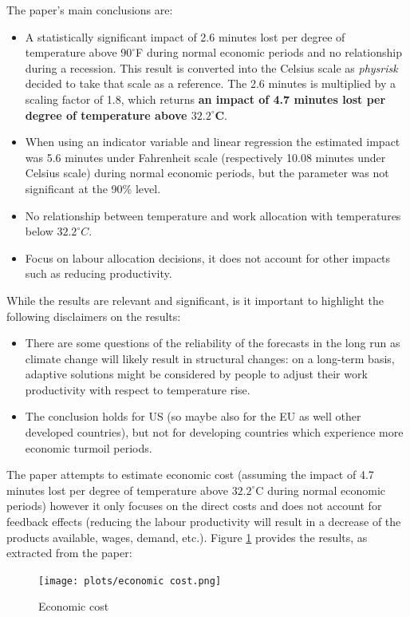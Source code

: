 \documentclass[a4paper,11pt]{extarticle} %
\begin{document}
The paper's main conclusions are:
\begin{itemize}
    \item A statistically significant impact of 2.6 minutes lost per degree of temperature above $90^\circ$F during normal economic periods and no relationship during a recession. This result is converted into the Celsius scale as \emph{physrisk} decided to take that scale as a reference. The 2.6 minutes is multiplied by a scaling factor of 1.8, which returns \textbf{an impact of 4.7 minutes lost per degree of temperature above $\mathbf{32.2^\circ}$C}.
    \item When using an indicator variable and linear regression the estimated impact was 5.6 minutes under Fahrenheit scale (respectively 10.08 minutes under Celsius scale) during normal economic periods, but the parameter was not significant at the 90\% level.
    \item No relationship between temperature and work allocation with temperatures below  $32.2^\circ C$.
    \item Focus on labour allocation decisions, it does not account for other impacts such as reducing productivity.
\end{itemize}

While the results are relevant and significant, is it important to highlight the following disclaimers on the results:
\begin{itemize}
    \item There are some questions of the reliability of the forecasts in the long run as climate change will likely result in structural changes: on a long-term basis, adaptive solutions might be considered by people to adjust their work productivity with respect to temperature rise.
    \item The conclusion holds for US (so maybe also for the EU as well other developed countries), but not for developing countries which experience more economic turmoil periods.
\end{itemize}

The paper attempts to estimate economic cost (assuming the impact of 4.7 minutes lost per degree of temperature above $32.2^\circ $C during normal economic periods) however it only focuses on the direct costs and does not account for feedback effects (reducing the labour productivity will result in a decrease of the products available, wages, demand, etc.). Figure \ref{fig:economiccost} provides the results, as extracted from the paper:
\begin{figure}[h]
    \centering
    \texttt{[image: plots/economic cost.png]}
    \caption{Economic cost}
    \label{fig:economiccost}
\end{figure}
\end{document}
